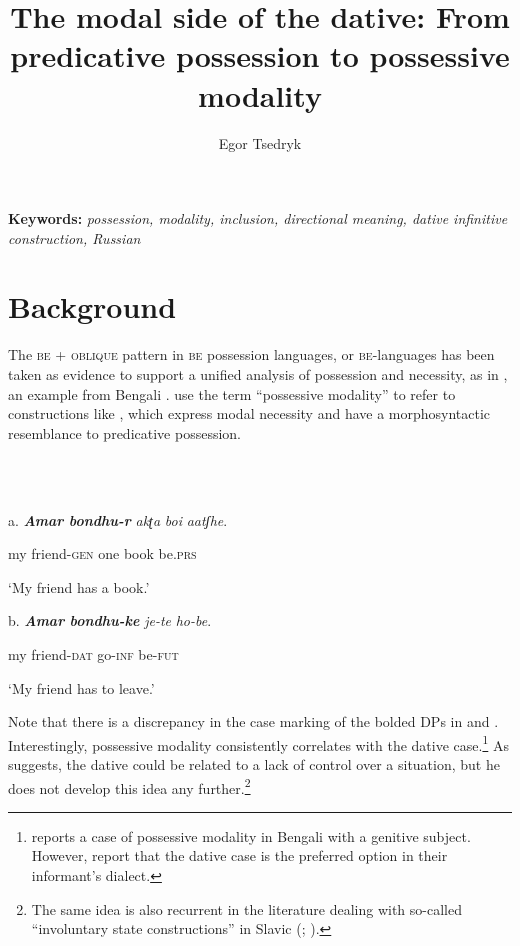 \documentclass[output=paper,colorlinks,citecolor=brown]{./langscibook}
\author{Egor Tsedryk	\affiliation{Saint Mary’s University}}
\title{The modal side of the dative: From predicative possession to possessive modality}
\begin{document}
\maketitle 

\textbf{Keywords:} \textit{possession, modality, inclusion, directional meaning, dative infinitive construction, Russian}

\section{Background}\label{sec:tsedryk:1}

The \textsc{be} + \textsc{oblique} pattern in \textsc{be} possession languages, or \textsc{be}{}-languages \citep{Isačenko1974} has been taken as evidence to support a unified analysis of possession and necessity, as in , an example from Bengali \citep[43]{BjorkmanCowper2016}. \citet[31]{BjorkmanCowper2016} use the term “possessive modality” to refer to constructions like , which express modal necessity and have a morphosyntactic resemblance to predicative possession. 

\ea%
    \label{ex:tsedryk:1}
    \gll\\
        \\
    \glt
    \z

          a.  \textbf{\textit{Amar}    \textit{bondhu-r}}     \textit{akʈa}   \textit{boi}     \textit{aatʃhe}.

    my       friend-\textsc{gen}  one     book   be.\textsc{prs}

      ‘My friend has a book.’

  b.    \textbf{\textit{Amar}    \textit{bondhu-ke}}    \textit{je-te}     \textit{ho-be}.

      my      friend-\textsc{dat}    go-\textsc{inf}   be-\textsc{fut}

      ‘My friend has to leave.’

Note that there is a discrepancy in the case marking of the bolded DPs in  and . Interestingly, possessive modality consistently correlates with the dative case.\footnote{\citet[example 7]{Bhatt1997} reports a case of possessive modality in Bengali with a genitive subject. However, \citet[46]{BjorkmanCowper2016} report that the dative case is the preferred option in their informant’s dialect.} As \citet[section 8.1]{Bhatt1997} suggests, the dative could be related to a lack of control over a situation, but he does not develop this idea any further.\footnote{The same idea is also recurrent in the literature dealing with so-called “involuntary state constructions” in Slavic (\citealt[154]{Rivero2009}; \citealt[312]{RiveroArregui2012}).}  
\end{document}

